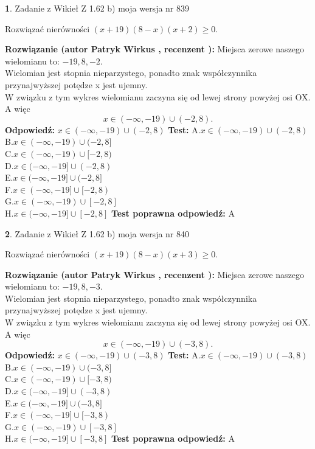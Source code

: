 \documentclass[12pt, a4paper]{article}
\theoremstyle{definition} %
\newtheorem{zad}{}
\newcommand{\zadStart}[1]{\begin{zad}#1\newline}
\newcommand{\zadStop}{\end{zad}}
\newcommand{\rozwStart}[2]{\noindent \textbf{Rozwiązanie (autor #1 , recenzent #2): }\newline}
\newcommand{\rozwStop}{\newline}
\newcommand{\odpStart}{\noindent \textbf{Odpowiedź:}\newline}
\newcommand{\odpStop}{\newline}
\newcommand{\testStart}{\noindent \textbf{Test:}\newline}
\newcommand{\testStop}{\newline}
\newcommand{\kluczStart}{\noindent \textbf{Test poprawna odpowiedź:}\newline}
\newcommand{\kluczStop}{\newline}
\begin{document}
\zadStart{Zadanie z Wikieł Z 1.62 b) moja wersja nr 839}

Rozwiązać nierówności $(x+19)(8-x)(x+2)\ge0$.
\zadStop
\rozwStart{Patryk Wirkus}{}
Miejsca zerowe naszego wielomianu to: $-19, 8, -2$.\\
Wielomian jest stopnia nieparzystego, ponadto znak współczynnika przy\linebreak najwyższej potędze x jest ujemny.\\ W związku z tym wykres wielomianu zaczyna się od lewej strony powyżej osi OX. A więc $$x \in (-\infty,-19) \cup (-2,8).$$
\rozwStop
\odpStart
$x \in (-\infty,-19) \cup (-2,8)$
\odpStop
\testStart
A.$x \in (-\infty,-19) \cup (-2,8)$\\
B.$x \in (-\infty,-19) \cup (-2,8]$\\
C.$x \in (-\infty,-19) \cup [-2,8)$\\
D.$x \in (-\infty,-19] \cup (-2,8)$\\
E.$x \in (-\infty,-19] \cup (-2,8]$\\
F.$x \in (-\infty,-19] \cup [-2,8)$\\
G.$x \in (-\infty,-19) \cup [-2,8]$\\
H.$x \in (-\infty,-19] \cup [-2,8]$
\testStop
\kluczStart
A
\kluczStop



\zadStart{Zadanie z Wikieł Z 1.62 b) moja wersja nr 840}

Rozwiązać nierówności $(x+19)(8-x)(x+3)\ge0$.
\zadStop
\rozwStart{Patryk Wirkus}{}
Miejsca zerowe naszego wielomianu to: $-19, 8, -3$.\\
Wielomian jest stopnia nieparzystego, ponadto znak współczynnika przy\linebreak najwyższej potędze x jest ujemny.\\ W związku z tym wykres wielomianu zaczyna się od lewej strony powyżej osi OX. A więc $$x \in (-\infty,-19) \cup (-3,8).$$
\rozwStop
\odpStart
$x \in (-\infty,-19) \cup (-3,8)$
\odpStop
\testStart
A.$x \in (-\infty,-19) \cup (-3,8)$\\
B.$x \in (-\infty,-19) \cup (-3,8]$\\
C.$x \in (-\infty,-19) \cup [-3,8)$\\
D.$x \in (-\infty,-19] \cup (-3,8)$\\
E.$x \in (-\infty,-19] \cup (-3,8]$\\
F.$x \in (-\infty,-19] \cup [-3,8)$\\
G.$x \in (-\infty,-19) \cup [-3,8]$\\
H.$x \in (-\infty,-19] \cup [-3,8]$
\testStop
\kluczStart
A
\kluczStop
\end{document}
